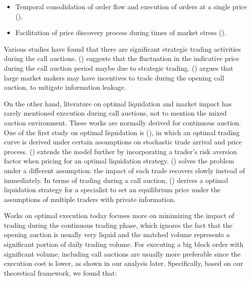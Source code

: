 \begin{itemize}
  \item Temporal consolidation of order flow and execution of orders at a single price (\cite{Economides1995}).
  \item Facilitation of price discovery process during times of market stress (\cite{Madhavan1992}).
\end{itemize}

Various studies have found that there are significant strategic trading activities during the call auctions. (\cite{Bruno1999}) suggests that the fluctuation in the indicative price during the call auction period maybe due to strategic trading. (\cite{Vives2001}) argues that large market makers may have incentives to trade during the opening call auction, to mitigate information leakage.

On the other hand, literature on optimal liquidation and market impact has rarely mentioned execution during call auctions, not to mention the mixed auction environment. These works are normally derived for continuous auction. One of the first study on optimal liquidation is (\cite{Ho1981}), in which an optimal trading curve is derived under certain assumptions on stochastic trade arrival and price process. (\cite{Almgren2000}) extends the model further by incorporating a trader's risk aversion factor when pricing for an optimal liquidation strategy. (\cite{Obizhaeva2013}) solves the problem under a different assumption: the impact of each trade recovers slowly instead of immediately. In terms of trading during a call auction, (\cite{Madhavan2015}) derives a optimal liquidation strategy for a specialist to set an equilibrium price under the assumptions of multiple traders with private information.

Works on optimal execution today focuses more on minimizing the impact of trading during the continuous trading phase, which ignores the fact that the opening auction is usually very liquid and the matched volume represents a significant portion of daily trading volume. For executing a big block order with significant volume, including call auctions are usually more preferable since the execution cost is lower, as shown in our analysis later. Specifically, based on our theoretical framework, we found that:

